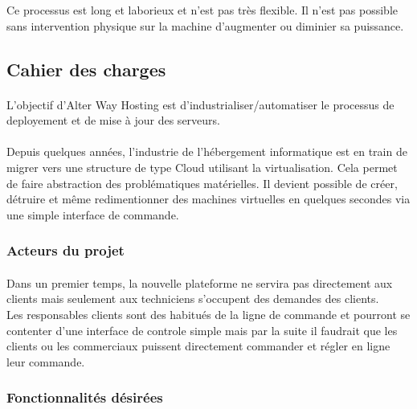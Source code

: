 Ce processus est long et laborieux et n'est pas très flexible. Il n'est pas possible sans intervention physique sur la machine d'augmenter ou diminier sa puissance.

\subsection{Cahier des charges}
\paragraph*{}
L'objectif d'Alter Way Hosting est d'industrialiser/automatiser le processus de deployement et de mise à jour des serveurs.

\paragraph*{}
Depuis quelques années, l'industrie de l'hébergement informatique est en train de migrer vers une structure de type Cloud utilisant la virtualisation.
Cela permet de faire abstraction des problématiques matérielles. Il devient possible de créer, détruire et même redimentionner des machines virtuelles en
quelques secondes via une simple interface de commande.

\subsubsection{Acteurs du projet}

\paragraph*{}
Dans un premier temps, la nouvelle plateforme ne servira pas directement aux clients mais seulement aux techniciens s'occupent des
demandes des clients.\\
Les responsables clients sont des habitués de la ligne de commande et pourront se contenter d'une interface de controle simple mais par la suite
il faudrait que les clients ou les commerciaux puissent directement commander et régler en ligne leur commande.

\subsubsection{Fonctionnalités désirées}

